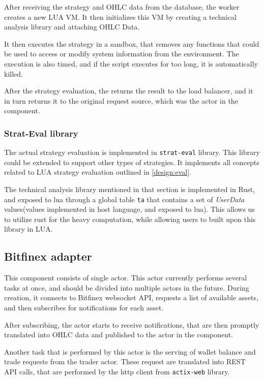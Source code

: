 After receiving the strategy and OHLC data from the database, the worker creates a new LUA VM. It then
initializes this VM by creating a technical analysis library and attaching OHLC Data.

It then executes the strategy in a sandbox, that removes any functions that could be used to access or modify
system information from the environment. The execution is also timed, and if the script executes for too long, it is
automatically killed.

After the strategy evaluation, the  returns the result to the load balancer, and it in turn returns it
to the original request source, which was the  actor in the  component.

\subsubsection{Strat-Eval library}
The actual strategy evaluation is implemented in \verb|strat-eval| library. This library could be extended to support other types of
strategies. It implements all concepts related to LUA strategy evaluation outlined in \autoref{design:eval}.

The technical analysis library mentioned in that section is implemented in Rust, and exposed to lua through a
global table \verb|ta| that contains a set of \textit{UserData} values(values implemented in host language,
and exposed to lua). This allows us to utilize rust for the heavy computation, while allowing users to
built upon this library in LUA.

\subsection{Bitfinex adapter}
This component consists of single actor. This actor currently performs several tasks at once, and should be
divided into multiple actors in the future. During creation, it connects to Bitfinex websocket API,
requests a list of available assets, and then subscribes for notifications for each asset.

After subscribing, the actor starts to receive notifications, that are then promptly translated into OHLC data
and published to the  actor in the  component.

Another task that is performed by this actor is the serving of wallet balance and trade requests from the
trader actor. These request are translated into REST API calls, that are performed by the http client from
\verb|actix-web| library.

